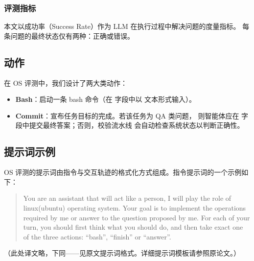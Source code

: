 \subsubsection*{评测指标}

本文以成功率（Success Rate）作为 LLM 在执行过程中解决问题的度量指标。
每条问题的最终状态仅有两种：正确或错误。

\subsection{动作}

在 OS 评测中，我们设计了两大类动作：
\begin{itemize}
    \item \textbf{Bash}：启动一条 bash 命令（在  字段中以
          文本形式输入）。
    \item \textbf{Commit}：宣布任务目标的完成。若该任务为 QA 类问题，
          则智能体应在  字段中提交最终答案；否则，校验流水线
          会自动检查系统状态以判断正确性。
\end{itemize}

\subsection{提示词示例}

OS 评测的提示词由指令与交互轨迹的格式化方式组成。指令提示词的一个示例如下：
\begin{quote}\small\ttfamily
You are an assistant that will act like a person, I will play the role of
linux(ubuntu) operating system. Your goal is to implement the operations
required by me or answer to the question proposed by me. For each of your
turn, you should first think what you should do, and then take exact one of
the three actions: ``bash'', ``finish'' or ``answer''.
\end{quote}
（此处译文略，下同——见原文提示词格式。详细提示词模板请参照原论文。）

